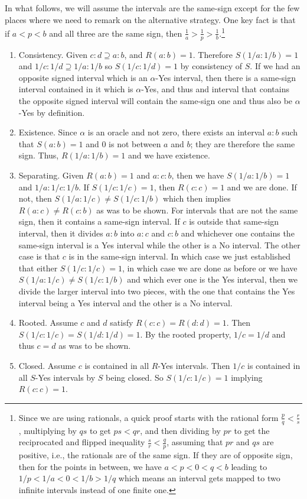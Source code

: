 \documentclass[12pt]{article}
\theoremstyle{remark}
\begin{document}
\begin{itemize}
    In what follows, we will assume the intervals are the same-sign except for the few places where we need to remark on the alternative strategy. One key fact is that if $a<p<b$ and all three are the same sign, then $\frac{1}{a} > \frac{1}{p} > \frac{1}{b}$.\footnote{Since we are using rationals, a quick proof starts with the rational form $\frac{p}{q} < \frac{r}{s}$, multiplying by $qs$ to get $ps < qr$, and then dividing by $pr$ to get the reciprocated and flipped inequality $\frac{s}{r} < \frac{q}{p}$, assuming that $pr$ and $qs$ are positive, i.e., the rationals are of the same sign. If they are of opposite sign, then for the points in between, we have $a < p < 0< q< b$ leading to $1/p < 1/a < 0 < 1/b > 1/q$ which means an interval gets mapped to two infinite intervals instead of one finite one.}
    
    \begin{enumerate}
        \item Consistency. Given $c:d \supseteq a:b$, and $R(a:b)=1$. Therefore $S(1/a:1/b) = 1$ and $1/c:1/d \supseteq 1/a:1/b$ so $S(1/c:1/d)=1$ by consistency of $S$. If we had an opposite signed interval which is an $\alpha$-Yes interval, then there is a same-sign interval contained in it which is $\alpha$-Yes, and thus and interval that contains the opposite signed interval will contain the same-sign one and thus also be $\alpha$-Yes by definition. 
        \item Existence. Since $\alpha$ is an oracle and not zero, there exists an interval $a:b$ such that $S(a:b)=1$ and 0 is not between $a$ and $b$; they are therefore the same sign. Thus, $R(1/a:1/b)=1$ and we have existence. 
        \item Separating. Given $R(a:b)=1$ and $a:c:b$, then we have $S(1/a:1/b)=1$ and $1/a:1/c:1/b$. If $S(1/c:1/c)=1$, then $R(c:c)=1$ and we are done. If not, then $S(1/a:1/c) \neq S(1/c:1/b)$ which then implies $R(a:c)\neq R(c:b)$ as was to be shown. For intervals that are not the same sign, then it contains a same-sign interval. If $c$ is outside that same-sign interval, then it divides $a:b$ into $a:c$ and $c:b$ and whichever one contains the same-sign interval is a Yes interval while the other is a No interval. The other case is that $c$ is in the same-sign interval. In which case we just established that either $S(1/c:1/c) = 1$, in which case we are done as before or we have $S(1/a:1/c) \neq S(1/c : 1/b)$ and which ever one is the Yes interval, then we divide the larger interval into two pieces, with the one that contains the Yes interval being a Yes interval and the other is a No interval.  
        \item Rooted. Assume $c$ and $d$ satisfy $R(c:c)=R(d:d)=1$. Then $S(1/c:1/c)=S(1/d:1/d)=1$. By the rooted property, $1/c = 1/d$ and thus $c=d$ as was to be shown. 
        \item Closed. Assume $c$ is contained in all $R$-Yes intervals. Then $1/c$ is contained in all $S$-Yes intervals by $S$ being closed. So $S(1/c:1/c)=1$ implying $R(c:c)=1$.
    \end{enumerate}
    

\end{itemize}
\end{document}
